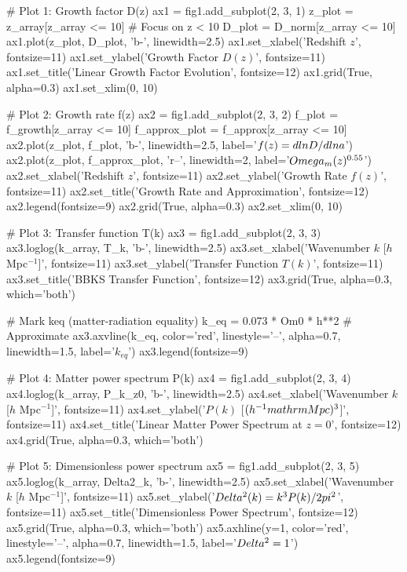 \documentclass[a4paper, 11pt]{article}
\begin{document}
\begin{pycode}
# Plot 1: Growth factor D(z)
ax1 = fig1.add_subplot(2, 3, 1)
z_plot = z_array[z_array <= 10]  # Focus on z < 10
D_plot = D_norm[z_array <= 10]
ax1.plot(z_plot, D_plot, 'b-', linewidth=2.5)
ax1.set_xlabel('Redshift $z$', fontsize=11)
ax1.set_ylabel('Growth Factor $D(z)$', fontsize=11)
ax1.set_title('Linear Growth Factor Evolution', fontsize=12)
ax1.grid(True, alpha=0.3)
ax1.set_xlim(0, 10)

# Plot 2: Growth rate f(z)
ax2 = fig1.add_subplot(2, 3, 2)
f_plot = f_growth[z_array <= 10]
f_approx_plot = f_approx[z_array <= 10]
ax2.plot(z_plot, f_plot, 'b-', linewidth=2.5, label='$f(z) = d\\ln D/d\\ln a$')
ax2.plot(z_plot, f_approx_plot, 'r--', linewidth=2, label='$\\Omega_m(z)^{0.55}$')
ax2.set_xlabel('Redshift $z$', fontsize=11)
ax2.set_ylabel('Growth Rate $f(z)$', fontsize=11)
ax2.set_title('Growth Rate and Approximation', fontsize=12)
ax2.legend(fontsize=9)
ax2.grid(True, alpha=0.3)
ax2.set_xlim(0, 10)

# Plot 3: Transfer function T(k)
ax3 = fig1.add_subplot(2, 3, 3)
ax3.loglog(k_array, T_k, 'b-', linewidth=2.5)
ax3.set_xlabel('Wavenumber $k$ [$h$ Mpc$^{-1}$]', fontsize=11)
ax3.set_ylabel('Transfer Function $T(k)$', fontsize=11)
ax3.set_title('BBKS Transfer Function', fontsize=12)
ax3.grid(True, alpha=0.3, which='both')

# Mark keq (matter-radiation equality)
k_eq = 0.073 * Om0 * h**2  # Approximate
ax3.axvline(k_eq, color='red', linestyle='--', alpha=0.7, linewidth=1.5, label='$k_{eq}$')
ax3.legend(fontsize=9)

# Plot 4: Matter power spectrum P(k)
ax4 = fig1.add_subplot(2, 3, 4)
ax4.loglog(k_array, P_k_z0, 'b-', linewidth=2.5)
ax4.set_xlabel('Wavenumber $k$ [$h$ Mpc$^{-1}$]', fontsize=11)
ax4.set_ylabel('$P(k)$ [$(h^{-1}\\mathrm{Mpc})^3$]', fontsize=11)
ax4.set_title('Linear Matter Power Spectrum at $z=0$', fontsize=12)
ax4.grid(True, alpha=0.3, which='both')

# Plot 5: Dimensionless power spectrum
ax5 = fig1.add_subplot(2, 3, 5)
ax5.loglog(k_array, Delta2_k, 'b-', linewidth=2.5)
ax5.set_xlabel('Wavenumber $k$ [$h$ Mpc$^{-1}$]', fontsize=11)
ax5.set_ylabel('$\\Delta^2(k) = k^3 P(k) / 2\\pi^2$', fontsize=11)
ax5.set_title('Dimensionless Power Spectrum', fontsize=12)
ax5.grid(True, alpha=0.3, which='both')
ax5.axhline(y=1, color='red', linestyle='--', alpha=0.7, linewidth=1.5, label='$\\Delta^2=1$')
ax5.legend(fontsize=9)


\end{pycode}
\end{document}
